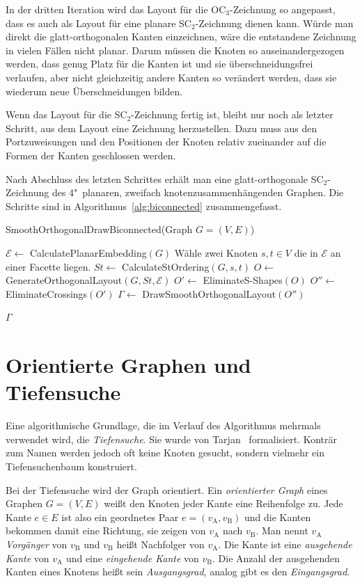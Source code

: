 \documentclass[a4paper]{scrreprt}
\theoremstyle{definition}
\newcommand{\Epsilon}{\mathcal{E}}
\begin{document}
In der dritten Iteration wird das Layout für die OC$_3$-Zeichnung so angepasst, dass es auch als Layout für eine planare SC$_2$-Zeichnung dienen kann. Würde man direkt die glatt-orthogonalen Kanten einzeichnen, wäre die entstandene Zeichnung in vielen Fällen nicht planar. Darum müssen die Knoten so auseinandergezogen werden, dass genug Platz für die Kanten ist und sie überschneidungsfrei verlaufen, aber nicht gleichzeitig andere Kanten so verändert werden, dass sie wiederum neue Überschneidungen bilden.

Wenn das Layout für die SC$_2$-Zeichnung fertig ist, bleibt nur noch als letzter Schritt, aus dem Layout eine Zeichnung herzustellen. Dazu muss aus den Portzuweisungen und den Positionen der Knoten relativ zueinander auf die Formen der Kanten geschlossen werden.

Nach Abschluss des letzten Schrittes erhält man eine glatt-orthogonale SC$_2$-Zeichnung des 4"~planaren, zweifach knotenzusammenhängenden Graphen. Die Schritte sind in Algorithmus~\ref{alg:biconnected} zusammengefasst.

\begin{algorithm}[ht]
  \caption{SmoothOrthogonalDrawBiconnected(Graph $G = (V,E)$)}
  \label{alg:biconnected}
  
  $\Epsilon \leftarrow$ CalculatePlanarEmbedding$(G)$ \;
  Wähle zwei Knoten $s, t \in V$ die in $\Epsilon$ an einer Facette liegen.\;
  $St \leftarrow$ CalculateStOrdering$(G, s, t)$ \;
  $O \leftarrow$ GenerateOrthogonalLayout$(G,St,\Epsilon)$ \;
  $O' \leftarrow$ EliminateS-Shapes$(O)$ \;
  $O'' \leftarrow$ EliminateCrossings$(O')$ \;
  $\Gamma \leftarrow$ DrawSmoothOrthogonalLayout$(O'')$ \;
  
  \Return $\Gamma$
\end{algorithm}

\section{Orientierte Graphen und Tiefensuche}

Eine algorithmische Grundlage, die im Verlauf des Algorithmus mehrmals verwendet wird, die \emph{Tiefensuche}. Sie wurde von Tarjan~\cite{tarjan-72} formalisiert. Konträr zum Namen werden jedoch oft keine Knoten gesucht, sondern vielmehr ein Tiefensuchenbaum konstruiert.

Bei der Tiefensuche wird der Graph orientiert. Ein \emph{orientierter Graph} eines Graphen $G = (V, E)$ weißt den Knoten jeder Kante eine Reihenfolge zu. Jede Kante $e \in E$ ist also ein geordnetes Paar $e = (v_\text{A}, v_\text{B})$ und die Kanten bekommen damit eine Richtung, sie zeigen von $v_\text{A}$ nach $v_\text{B}$. Man nennt $v_\text{A}$ \emph{Vorgänger} von $v_\text{B}$ und $v_\text{B}$ heißt Nachfolger von $v_\text{A}$. Die Kante ist eine \emph{ausgehende Kante} von $v_\text{A}$ und eine \emph{eingehende Kante} von $v_\text{B}$. Die Anzahl der ausgehenden Kanten eines Knotens heißt sein \emph{Ausgangsgrad}, analog gibt es den \emph{Eingangsgrad}.
\end{document}
